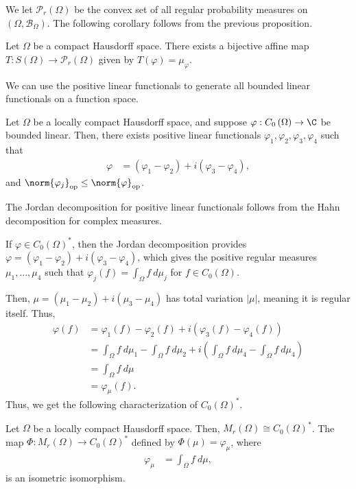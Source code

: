 \documentclass[10pt]{mypackage}
\begin{document}
We let $\mathcal{P}_r\left(\Omega\right)$ be the convex set of all regular probability measures on $\left(\Omega,\mathcal{B}_\Omega\right)$. The following corollary follows from the previous proposition.
\begin{corollary}
  Let $\Omega$ be a compact Hausdorff space. There exists a bijective affine map $T: S\left(\Omega\right)\rightarrow \mathcal{P}_{r}\left(\Omega\right)$ given by $T\left(\varphi\right) = \mu_{\varphi}$.
\end{corollary}
We can use the positive linear functionals to generate all bounded linear functionals on a function space.
\begin{theorem}
  Let $\Omega$ be a locally compact Hausdorff space, and suppose $\varphi: C_0\left(\Omega\right)\rightarrow \C$ be bounded linear. Then, there exists positive linear functionals $\varphi_1,\varphi_2,\varphi_3,\varphi_4$ such that
  \begin{align*}
    \varphi &= \left(\varphi_1-\varphi_2\right) + i\left(\varphi_3 - \varphi_4\right),
  \end{align*}
  and $\norm{\varphi_j}_{\text{op}}\leq \norm{\varphi}_{\text{op}}$.
\end{theorem}
\begin{remark}
  The Jordan decomposition for positive linear functionals follows from the Hahn decomposition for complex measures.
\end{remark}
If $\varphi\in C_0\left(\Omega\right)^{\ast}$, then the Jordan decomposition provides $\varphi = \left(\varphi_1-\varphi_2\right) + i\left(\varphi_3 - \varphi_4\right)$, which gives the positive regular measures $\mu_1,\dots,\mu_4$ such that $\varphi_j\left(f\right) = \int_{\Omega}f\:d\mu_j$ for $f\in C_0\left(\Omega\right)$.\newline

Then, $\mu = \left(\mu_1 - \mu_2\right) + i\left(\mu_3 - \mu_4\right)$ has total variation $\left\vert \mu \right\vert$, meaning it is regular itself. Thus,
\begin{align*}
  \varphi(f) &= \varphi_1\left(f\right) - \varphi_2\left(f\right) + i\left(\varphi_3\left(f\right) - \varphi_4\left(f\right)\right)\\
             &= \int_{\Omega}f\:d\mu_1 - \int_{\Omega}f\:d\mu_2 + i \left(\int_{\Omega}f\:d\mu_4 - \int_{\Omega}f\:d\mu_4\right)\\
             &= \int_{\Omega}f\:d\mu\\
             &= \varphi_{\mu}\left(f\right).
\end{align*}
Thus, we get the following characterization of $C_0\left(\Omega\right)^{\ast}$.
\begin{theorem}
  Let $\Omega$ be a locally compact Hausdorff space. Then, $M_r\left(\Omega\right) \cong C_0\left(\Omega\right)^{\ast}$. The map $\Phi: M_r\left(\Omega\right)\rightarrow C_0\left(\Omega\right)^{\ast}$ defined by $\Phi\left(\mu\right) = \varphi_{\mu}$, where
  \begin{align*}
    \varphi_\mu &= \int_{\Omega}f\:d\mu,
  \end{align*}
  is an isometric isomorphism.
\end{theorem}
\end{document}
